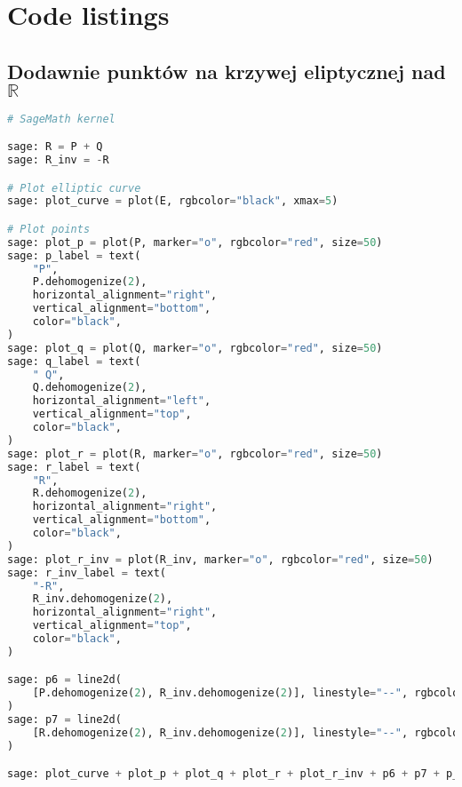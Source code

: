 \newpage %
\section{Code listings}
\subsection*{Dodawnie punktów na krzywej eliptycznej nad $\mathbb{R}$}

\begin{lstlisting}[language=python, label=sage_1, caption=Dodawnie punktów na krzywej eliptycznej na liczbach rzeczywistych]
# SageMath kernel

sage: R = P + Q
sage: R_inv = -R

# Plot elliptic curve
sage: plot_curve = plot(E, rgbcolor="black", xmax=5)

# Plot points
sage: plot_p = plot(P, marker="o", rgbcolor="red", size=50)
sage: p_label = text(
    "P",
    P.dehomogenize(2),
    horizontal_alignment="right",
    vertical_alignment="bottom",
    color="black",
)
sage: plot_q = plot(Q, marker="o", rgbcolor="red", size=50)
sage: q_label = text(
    " Q",
    Q.dehomogenize(2),
    horizontal_alignment="left",
    vertical_alignment="top",
    color="black",
)
sage: plot_r = plot(R, marker="o", rgbcolor="red", size=50)
sage: r_label = text(
    "R",
    R.dehomogenize(2),
    horizontal_alignment="right",
    vertical_alignment="bottom",
    color="black",
)
sage: plot_r_inv = plot(R_inv, marker="o", rgbcolor="red", size=50)
sage: r_inv_label = text(
    "-R",
    R_inv.dehomogenize(2),
    horizontal_alignment="right",
    vertical_alignment="top",
    color="black",
)

sage: p6 = line2d(
    [P.dehomogenize(2), R_inv.dehomogenize(2)], linestyle="--", rgbcolor="blue"
)
sage: p7 = line2d(
    [R.dehomogenize(2), R_inv.dehomogenize(2)], linestyle="--", rgbcolor="blue"
)

sage: plot_curve + plot_p + plot_q + plot_r + plot_r_inv + p6 + p7 + p_label + q_label + r_label + r_inv_label
\end{lstlisting}

